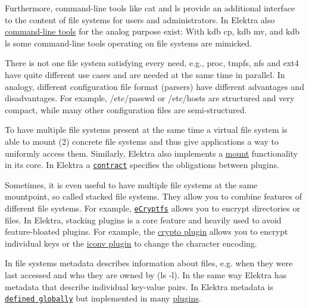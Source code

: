 Furthermore, command-\/line tools like {\ttfamily cat} and {\ttfamily ls} provide an additional interface to the content of file systems for users and administrators. In Elektra also \hyperlink{md_doc_help_kdb-introduction_doc_help_kdb-introduction_md}{command-\/line tools} for the analog purpose exist\+: With {\ttfamily kdb cp}, {\ttfamily kdb mv}, and {\ttfamily kdb ls} some command-\/line tools operating on file systems are mimicked.

There is not one file system satisfying every need, e.\+g., {\ttfamily proc}, {\ttfamily tmpfs}, {\ttfamily nfs} and {\ttfamily ext4} have quite different use cases and are needed at the same time in parallel. In analogy, different configuration file format (parsers) have different advantages and disadvantages. For example, {\ttfamily /etc/passwd} or {\ttfamily /etc/hosts} are structured and very compact, while many other configuration files are semi-\/structured.

To have multiple file systems present at the same time a virtual file system is able to mount (2) concrete file systems and thus give applications a way to uniformly access them. Similarly, Elektra also implements a \hyperlink{md_doc_help_elektra-mounting_doc_help_elektra-mounting_md}{mount} functionality in its core. In Elektra a \href{/home/markus/Projekte/Elektra/current/doc/CONTRACT.ini}{\tt contract} specifies the obligations between plugins.

Sometimes, it is even useful to have multiple file systems at the same mountpoint, so called {\ttfamily stacked} file systems. They allow you to combine features of different file systems. For example, \href{https://wiki.archlinux.org/index.php/ECryptfs}{\tt e\+Cryptfs} allows you to encrypt directories or files. In Elektra, stacking plugins is a core feature and heavily used to avoid feature-\/bloated plugins. For example, the \hyperlink{md_src_plugins_crypto_README_src_plugins_crypto_README_md}{crypto plugin} allows you to encrypt individual keys or the \hyperlink{md_src_plugins_iconv_README_src_plugins_iconv_README_md}{iconv plugin} to change the character encoding.

In file systems metadata describes information about files, e.\+g. when they were last accessed and who they are owned by ({\ttfamily ls -\/l}). In the same way Elektra has metadata that describe individual key-\/value pairs. In Elektra metadata is \href{/home/markus/Projekte/Elektra/current/doc/METADATA.ini}{\tt defined globally} but implemented in many \hyperlink{md_src_plugins_README_src_plugins_README_md}{plugins}.

